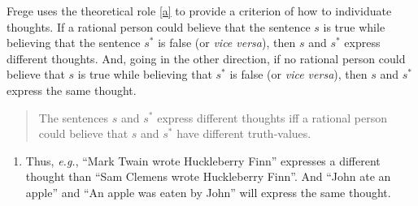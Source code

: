 \documentclass[landscape, two column, full page,reqno]{article}
\newcommand{\qd}{\begin{quote}\begin{description}  [align=left,style=nextline,leftmargin=*,labelsep=0pt,font=\normalfont]}
\newcommand{\zd}{\end{description}\end{quote}}
\newcommand{\qe}{\begin{enumerate}[align=left,style=nextline,leftmargin=17pt,labelsep=5pt,font=\normalfont]}
\newcommand{\ze}{\end{enumerate}}
\newcommand{\p}{\item}
\newcommand{\e}{\emph}
\newcommand{\s}{\textsc}
\begin{document}
\p Frege uses the theoretical role \eqref{a} to provide a criterion of how to individuate thoughts.  If a rational person could believe that the sentence $s$ is true while believing that the sentence $s^*$ is false (or \e{vice versa}), then $s$ and $s^*$ express different thoughts.  And, going in the other direction, if no rational person could believe that $s$ is true while believing that $s^*$ is false (or \e{vice versa}), then $s$ and $s^*$ express the same thought.
	\qd
	\p[\s{Individuation of Thoughts}] The sentences $s$ and $s^*$ express different thoughts iff a rational person could believe that $s$ and $s^*$ have different truth-values.
	\zd 
	\qe
	\p Thus, \e{e.g.}, ``Mark Twain wrote Huckleberry Finn''  expresses a different thought than ``Sam Clemens wrote Huckleberry Finn''.  And ``John ate an apple'' and ``An apple was eaten by John'' will express the same thought.
	\ze 
	
\end{document}
